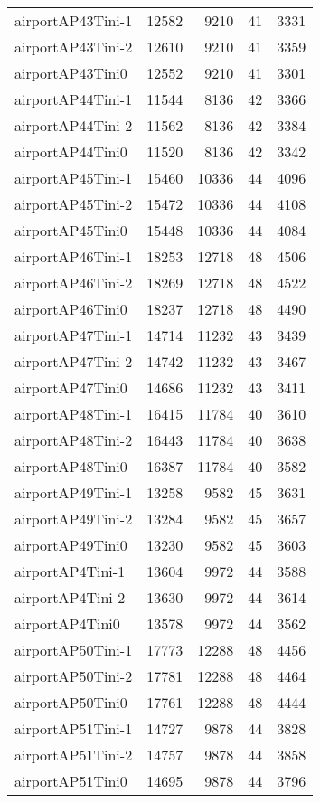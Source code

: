 \begin{tabular}{lrrrr}
airportAP43Tini-1 & 12582 & 9210 & 41 & 3331 \\
airportAP43Tini-2 & 12610 & 9210 & 41 & 3359 \\
airportAP43Tini0 & 12552 & 9210 & 41 & 3301 \\
airportAP44Tini-1 & 11544 & 8136 & 42 & 3366 \\
airportAP44Tini-2 & 11562 & 8136 & 42 & 3384 \\
airportAP44Tini0 & 11520 & 8136 & 42 & 3342 \\
airportAP45Tini-1 & 15460 & 10336 & 44 & 4096 \\
airportAP45Tini-2 & 15472 & 10336 & 44 & 4108 \\
airportAP45Tini0 & 15448 & 10336 & 44 & 4084 \\
airportAP46Tini-1 & 18253 & 12718 & 48 & 4506 \\
airportAP46Tini-2 & 18269 & 12718 & 48 & 4522 \\
airportAP46Tini0 & 18237 & 12718 & 48 & 4490 \\
airportAP47Tini-1 & 14714 & 11232 & 43 & 3439 \\
airportAP47Tini-2 & 14742 & 11232 & 43 & 3467 \\
airportAP47Tini0 & 14686 & 11232 & 43 & 3411 \\
airportAP48Tini-1 & 16415 & 11784 & 40 & 3610 \\
airportAP48Tini-2 & 16443 & 11784 & 40 & 3638 \\
airportAP48Tini0 & 16387 & 11784 & 40 & 3582 \\
airportAP49Tini-1 & 13258 & 9582 & 45 & 3631 \\
airportAP49Tini-2 & 13284 & 9582 & 45 & 3657 \\
airportAP49Tini0 & 13230 & 9582 & 45 & 3603 \\
airportAP4Tini-1 & 13604 & 9972 & 44 & 3588 \\
airportAP4Tini-2 & 13630 & 9972 & 44 & 3614 \\
airportAP4Tini0 & 13578 & 9972 & 44 & 3562 \\
airportAP50Tini-1 & 17773 & 12288 & 48 & 4456 \\
airportAP50Tini-2 & 17781 & 12288 & 48 & 4464 \\
airportAP50Tini0 & 17761 & 12288 & 48 & 4444 \\
airportAP51Tini-1 & 14727 & 9878 & 44 & 3828 \\
airportAP51Tini-2 & 14757 & 9878 & 44 & 3858 \\
airportAP51Tini0 & 14695 & 9878 & 44 & 3796 \\

\end{tabular}
